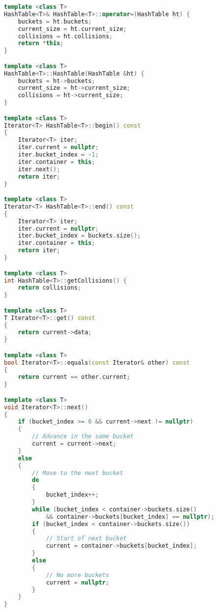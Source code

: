 \documentclass[letterpaper, 11pt]{article}
\begin{document}
\begin{lstlisting}[language=c++, caption=hashtable.cpp]
template <class T>
HashTable<T>& HashTable<T>::operator=(HashTable ht) {
    buckets = ht.buckets;
    current_size = ht.current_size;
    collisions = ht.collisions;
    return *this;
}

template <class T>
HashTable<T>::HashTable(HashTable &ht) {
    buckets = ht->buckets;
    current_size = ht->current_size;
    collisions = ht->current_size;
}

template <class T>
Iterator<T> HashTable<T>::begin() const
{
    Iterator<T> iter;
    iter.current = nullptr;
    iter.bucket_index = -1;
    iter.container = this;
    iter.next();
    return iter;
}

template <class T>
Iterator<T> HashTable<T>::end() const
{
    Iterator<T> iter;
    iter.current = nullptr;
    iter.bucket_index = buckets.size();
    iter.container = this;
    return iter;
}

template <class T>
int HashTable<T>::getCollisions() {
    return collisions;
}

template <class T>
T Iterator<T>::get() const
{
    return current->data;
}

template <class T>
bool Iterator<T>::equals(const Iterator& other) const
{
    return current == other.current;
}

template <class T>
void Iterator<T>::next()
{
    if (bucket_index >= 0 && current->next != nullptr)
    {
        // Advance in the same bucket
        current = current->next;
    }   
    else 
    {
        // Move to the next bucket
        do
        {
            bucket_index++;
        }
        while (bucket_index < container->buckets.size()
            && container->buckets[bucket_index] == nullptr);
        if (bucket_index < container->buckets.size())
        {
            // Start of next bucket
            current = container->buckets[bucket_index];         
        }
        else 
        {
            // No more buckets
            current = nullptr;
        }
    }
}    
\end{lstlisting}
\end{document}
